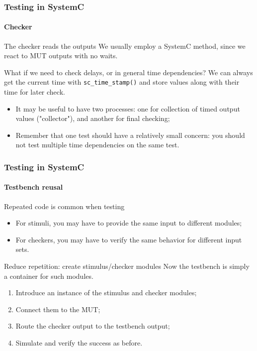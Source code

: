 \begin{frame}
\frametitle{Testing in SystemC}
\framesubtitle{Checker}

\begin{block}{The checker reads the outputs}
We usually employ a SystemC method, since we react to MUT outputs with no waits.
\end{block}
\pause
\begin{block}{What if we need to check delays, or in general time dependencies?}
We can always get the current time with \texttt{sc\_time\_stamp()} and store values along with their time for later check.
\begin{itemize}
\item It may be useful to have two processes: one for collection of timed output values ("collector"), and another for final checking;
\item Remember that one test should have a relatively small concern: you should not test multiple time dependencies on the same test.
\end{itemize}
\end{block}
\end{frame}

\begin{frame}
\frametitle{Testing in SystemC}
\framesubtitle{Testbench reusal}

\begin{block}{Repeated code is common when testing}
\begin{itemize}
\item For stimuli, you may have to provide the same input to different modules;
\item For checkers, you may have to verify the same behavior for different input sets.
\end{itemize}
\end{block}
\pause
\begin{block}{Reduce repetition: create stimulus/checker modules}
Now the testbench is simply a container for such modules. 
\begin{enumerate}
\item Introduce an instance of the stimulus and checker modules;
\pause
\item Connect them to the MUT;
\pause
\item Route the checker output to the testbench output;
\pause
\item Simulate and verify the success as before.
\end{enumerate}
\end{block}
\end{frame}